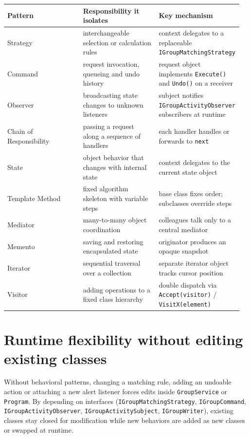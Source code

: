 \documentclass{utmreport}
\providecommand{\passthrough}[1]{#1}
\newcounter{none}
\begin{document}
{\def\LTcaptype{none} %
\begin{longtable}[]{@{}>{\raggedright\arraybackslash}p{0.320\linewidth}>{\raggedright\arraybackslash}p{0.320\linewidth}>{\raggedright\arraybackslash}p{0.320\linewidth}@{}}
\toprule\noalign{}
Pattern & Responsibility it isolates & Key mechanism \\
\midrule\noalign{}
\endhead
\bottomrule\noalign{}
\endlastfoot
Strategy & interchangeable selection or calculation rules & context delegates to a replaceable \passthrough{\lstinline!IGroupMatchingStrategy!} \\
Command & request invocation, queueing and undo history & request object implements \passthrough{\lstinline!Execute()!} and \passthrough{\lstinline!Undo()!} on a receiver \\
Observer & broadcasting state changes to unknown listeners & subject notifies \passthrough{\lstinline!IGroupActivityObserver!} subscribers at runtime \\
Chain of Responsibility & passing a request along a sequence of handlers & each handler handles or forwards to \passthrough{\lstinline!next!} \\
State & object behavior that changes with internal state & context delegates to the current state object \\
Template Method & fixed algorithm skeleton with variable steps & base class fixes order; subclasses override steps \\
Mediator & many-to-many object coordination & colleagues talk only to a central mediator \\
Memento & saving and restoring encapsulated state & originator produces an opaque snapshot \\
Iterator & sequential traversal over a collection & separate iterator object tracks cursor position \\
Visitor & adding operations to a fixed class hierarchy & double dispatch via \passthrough{\lstinline!Accept(visitor)!} / \passthrough{\lstinline!VisitX(element)!} \\
\end{longtable}
}

\section{Runtime flexibility without editing existing classes}

Without behavioral patterns, changing a matching rule, adding an undoable action or attaching a new alert listener forces edits inside \passthrough{\lstinline!GroupService!} or \passthrough{\lstinline!Program!}. By depending on interfaces (\passthrough{\lstinline!IGroupMatchingStrategy!}, \passthrough{\lstinline!IGroupCommand!}, \passthrough{\lstinline!IGroupActivityObserver!}, \passthrough{\lstinline!IGroupActivitySubject!}, \passthrough{\lstinline!IGroupWriter!}), existing classes stay closed for modification while new behaviors are added as new classes or swapped at runtime.
\end{document}
